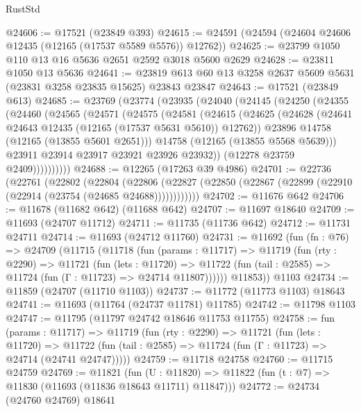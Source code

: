 \begin{lexlean}{RustStd}
\begin{coremodule}
@24606 := @17521 (@23849 @393)
@24615 := @24591 (@24594 (@24604 @24606 @12435 (@12165 (@17537 @5589 @5576)) @12762))
@24625 := @23799 @1050 @110 @13 @16 @5636 @2651 @2592 @3018 @5600 @2629
@24628 := @23811 @1050 @13 @5636
@24641 := @23819 @613 @60 @13 @3258 @2637 @5609 @5631 (@23831 @3258 @23835 @15625) @23843 @23847
@24643 := @17521 (@23849 @613)
@24685 := @23769
    (@23774
      (@23935
        (@24040
          (@24145
            (@24250
              (@24355
                (@24460
                  (@24565
                    (@24571
                      (@24575
                        (@24581
                          (@24615
                            (@24625
                              (@24628 (@24641 @24643 @12435 (@12165 (@17537 @5631 @5610)) @12762))
                              @23896
                              @14758
                              (@12165 (@13855 @5601 @2651)))
                            @14758
                            (@12165 (@13855 @5568 @5639)))
                          @23911
                          @23914
                          @23917
                          @23921
                          @23926
                          @23932))
                      (@12278 @23759 @2409))))))))))
@24688 := @12265 (@17263 @39 @4986)
@24701 := @22736
    (@22761
      (@22802
        (@22804
          (@22806 (@22827 (@22850 (@22867 (@22899 (@22910 (@22914 (@23754 (@24685 @24688))))))))))))
@24702 := @11676 @642
@24706 := @11678 (@11682 @642) (@11688 @642)
@24707 := @11697 @18640
@24709 := @11693 (@24707 @11712)
@24711 := @11735 (@11736 @642)
@24712 := @11731 @24711
@24714 := @11693 (@24712 @11760)
@24731 := @11692
    (fun (fn : @76) =>
    @24709
      (@11715
        (@11718
          (fun (params : @11717) =>
          @11719
            (fun (rty : @2290) =>
            @11721
              (fun (lets : @11720) =>
              @11722 (fun (tail : @2585) => @11724 (fun (Γ : @11723) => @24714 @11807))))))
        @11853))
    @1103
@24734 := @11859 (@24707 (@11710 @1103))
@24737 := @11772 (@11773 @1103) @18643
@24741 := @11693 (@11764 (@24737 @11781) @11785)
@24742 := @11798 @1103
@24747 := @11795 (@11797 @24742 @18646 @11753 @11755)
@24758 := fun (params : @11717) =>
  @11719
    (fun (rty : @2290) =>
    @11721
      (fun (lets : @11720) =>
      @11722 (fun (tail : @2585) => @11724 (fun (Γ : @11723) => @24714 (@24741 @24747)))))
@24759 := @11718 @24758
@24760 := @11715 @24759
@24769 := @11821
    (fun (U : @11820) => @11822 (fun (t : @7) => @11830 (@11693 (@11836 @18643 @11711) @11847)))
@24772 := @24734 (@24760 @24769) @18641

\end{coremodule}
\end{lexlean}
